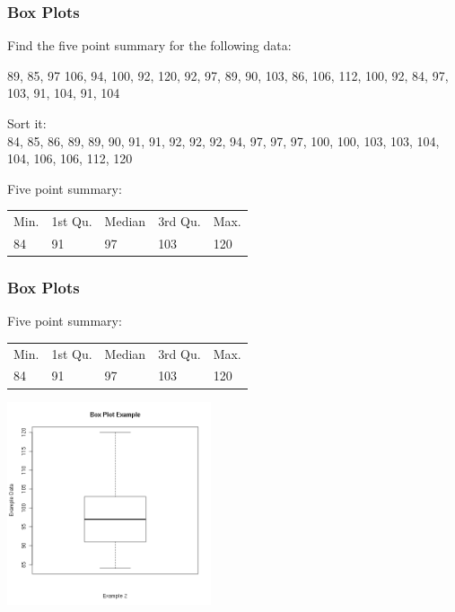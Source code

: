 \begin{frame}
  \frametitle{Box Plots}

  \vfill 

  Find the five point summary for the following data:

  \vfill

  {
    89, 85, 97 106, 94, 100, 92, 120, 92, 97, 89, 90, 103, 86, 106, 112, 100, 92, 84,
    97, 103, 91, 104, 91, 104

    \vfill
  }

  {
    Sort it: \\
    84, 85, 86, 89, 89, 90, 91, 91, 92, 92, 92, 94, 97, 97, 97, 100,
    100, 103, 103, 104, 104, 106, 106, 112, 120

    Five point summary: \\
    \begin{tabular}{lllll}
     Min. & 1st Qu. & Median    & 3rd Qu. &   Max. \\
     84   & 91      & 97        & 103     & 120
    \end{tabular}


  }

  \vfill

\end{frame}


\begin{frame}
  \frametitle{Box Plots}

    Five point summary: \\
    \begin{tabular}{lllll}
     Min. & 1st Qu. & Median    & 3rd Qu. &   Max. \\
     84   & 91      & 97        & 103     & 120
    \end{tabular}

    \begin{center}
      \includegraphics[width=6cm]{img/boxplotExample1}
    \end{center}

\end{frame}


